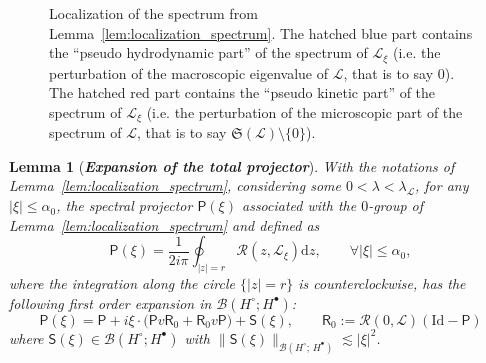 \documentclass[10pt]{amsart}
\newtheorem{lemm}[theo]{Lemma}\newtheorem{prop}[theo]{Proposition}\newtheorem{coro}[theo]{Corollary}\newtheorem{conj}[theo]{Conjecture}
\theoremstyle{definition}\newtheorem{defi}[theo]{Definition}\newtheorem{rema}[theo]{Remark}\newtheorem{exam}[theo]{Example}\newtheorem{exem}[theo]{Example}\newtheorem{nota}[theo]{Notation}
\newcommand{\Id}{\mathrm{Id}}
\renewcommand{\d}{\mathrm{d}}
\newcommand{\sfR}{\mathsf{R}}
\newcommand{\sfS}{\mathsf{S}}
\newcommand{\fkS}{\mathfrak{S}}
\newcommand{\BB}{\mathcal{B}}
\newcommand{\LL}{\mathcal{L}}
\newcommand{\PP}{\mathsf{P}}
\newcommand{\RR}{\mathcal{R}}
\newcommand{\BBB}{\mathscr{B}}
\newcommand{\Ssp}{H^{\bullet}}
\newcommand{\Ssm}{H^{\circ}}
\renewcommand*\le{\leqslant}
\let\oldforall\forall
\renewcommand*{\forall}{\mathrel{\oldforall}}
\begin{document}
\begin{figure}[h]

\centering


\caption{Localization of the spectrum from Lemma~\ref{lem:localization_spectrum}. The hatched blue part contains the ``pseudo hydrodynamic part'' of the spectrum of $\LL_\xi$ (i.e. the perturbation of the macroscopic eigenvalue of $\LL$, that is to say $0$). The hatched red part contains the ``pseudo kinetic part'' of the spectrum of $\LL_\xi$ (i.e. the perturbation of the microscopic part of the spectrum of $\LL$, that is to say $\fkS(\LL) \setminus \{0\}$).}
\end{figure}


\begin{lemm}[\emph{\textbf{Expansion of the total projector}}]\label{lem:expansion_projection}
With the notations of Lemma~\ref{lem:localization_spectrum}, considering some $0 < \lambda < \lambda_\LL$, for any $|\xi| \le \alpha_{0}$, the spectral projector $\PP(\xi)$ associated with the $0$-group of Lemma~\ref{lem:localization_spectrum} and defined as
\[
\PP(\xi) = \frac{1}{2 i \pi} \oint_{|z| = r } \RR(z,\LL_{\xi}) \d z, \qquad \forall | \xi | \le \alpha_0,
\]
where the integration along the circle $\{ |z| = r \}$ is counterclockwise, has the following first order expansion in $\BBB(\Ssm ; \Ssp)$:
\begin{equation*}
\PP(\xi) = \PP + i \xi \cdot \Big(\PP v\sfR_{0} +\sfR_{0} v \PP \Big) + \sfS(\xi), \qquad \sfR_{0}:=\RR(0,\LL)\left(\Id-\PP\right)
\end{equation*}
where $\sfS(\xi) \in \BBB(\Ssm ;\Ssp)$ with $\|\sfS(\xi)\|_{\BBB(\Ssm ;\,\Ssp)} \lesssim | \xi |^2$.
\end{lemm}
\end{document}
